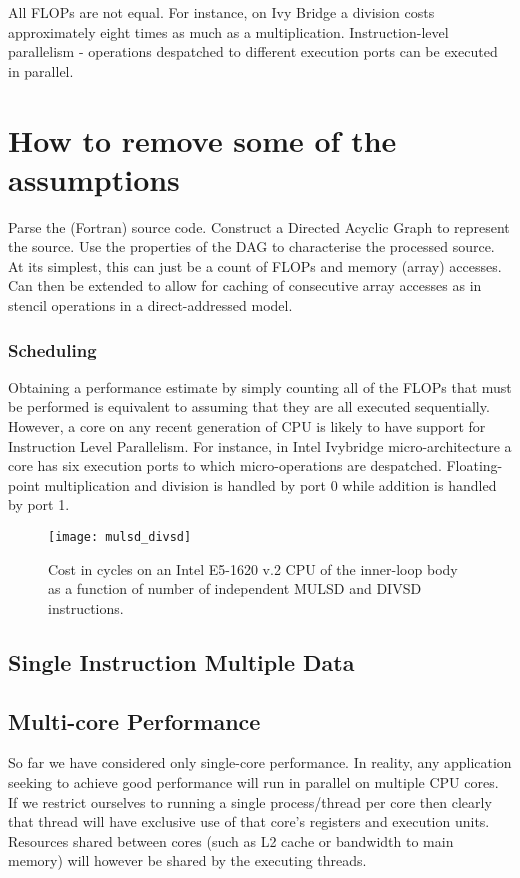 \documentclass[12pt]{article}
\begin{document}
All FLOPs are not equal. For instance, on Ivy Bridge a division costs
approximately eight times as much as a multiplication.
Instruction-level parallelism - operations despatched to different
execution ports can be executed in parallel.

\section{How to remove some of the assumptions}

Parse the (Fortran) source code.  Construct a Directed Acyclic Graph
to represent the source.  Use the properties of the DAG to
characterise the processed source.  At its simplest, this can just be
a count of FLOPs and memory (array) accesses.  Can then be extended to
allow for caching of consecutive array accesses as in stencil
operations in a direct-addressed model.

\subsubsection{Scheduling}

Obtaining a performance estimate by simply counting all of the FLOPs
that must be performed is equivalent to assuming that they are all
executed sequentially. However, a core on any recent generation of CPU
is likely to have support for Instruction Level Parallelism. For
instance, in Intel Ivybridge micro-architecture a core has six
execution ports to which micro-operations are
despatched. Floating-point multiplication and division is handled by
port 0 while addition is handled by port 1.

\begin{figure}
\texttt{[image: mulsd\_divsd]}
\caption{Cost in cycles on an Intel E5-1620 v.2 CPU of the inner-loop
  body as a function of number of independent MULSD and DIVSD
  instructions.}
\label{FIG_mul_div_overlap}
\end{figure}

\subsection{Single Instruction Multiple Data}

\subsection{Multi-core Performance}

So far we have considered only single-core performance. In reality,
any application seeking to achieve good performance will run in
parallel on multiple CPU cores.  If we restrict ourselves to running a
single process/thread per core then clearly that thread will have
exclusive use of that core's registers and execution units. Resources
shared between cores (such as L2 cache or bandwidth to main memory) will
however be shared by the executing threads.
\end{document}
